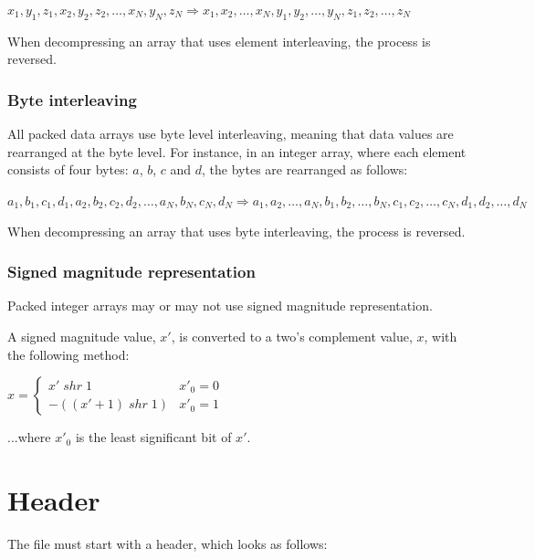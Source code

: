 \begin{center}
$x_1,y_1,z_1,x_2,y_2,z_2,\ldots,x_N,y_N,z_N \Rightarrow 
x_1,x_2,\ldots,x_N,y_1,y_2,\ldots,y_N,z_1,z_2,\ldots,z_N$
\end{center}

When decompressing an array that uses element interleaving, the process is
reversed.

\subsection{Byte interleaving}
All packed data arrays use byte level interleaving, meaning that data values
are rearranged at the byte level. For instance, in an integer array, where each
element consists of four bytes: $a$, $b$, $c$ and $d$, the bytes are rearranged
as follows:

\begin{center}
$a_1,b_1,c_1,d_1,a_2,b_2,c_2,d_2,\ldots,a_N,b_N,c_N,d_N \Rightarrow 
a_1,a_2,\ldots,a_N,b_1,b_2,\ldots,b_N,c_1,c_2,\ldots,c_N,d_1,d_2,\ldots,d_N$
\end{center}

When decompressing an array that uses byte interleaving, the process is
reversed.

\subsection{Signed magnitude representation}
Packed integer arrays may or may not use signed magnitude representation.

A signed magnitude value, $x'$, is converted to a two's complement value,
$x$, with the following method:

$x = \left\{\begin{array}{ll}
x'\; shr\; 1 & x'_0 = 0 \\
-((x'+1)\; shr\; 1) & x'_0 = 1
\end{array} \right.$

...where $x'_0$ is the least significant bit of $x'$.



\chapter{Header}
The file must start with a header, which looks as follows:


